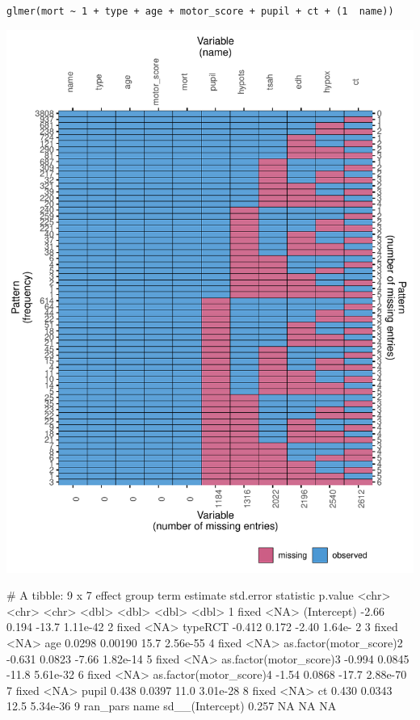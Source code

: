 \documentclass[
]{jss}
\begin{document}
\texttt{glmer(mort\ \textasciitilde{}\ 1\ +\ type\ +\ age\ +\ motor\_score\ +\ pupil\ +\ ct\ +\ (1\ \textbar{}\ name))}

\begin{CodeChunk}


\begin{center}\includegraphics{Imputation_of_Incomplete_Multilevel_Data_files/figure-latex/impact-1} \end{center}

\end{CodeChunk}

\begin{CodeChunk}
\begin{CodeOutput}
# A tibble: 9 x 7
  effect   group term                    estimate std.error statistic   p.value
  <chr>    <chr> <chr>                      <dbl>     <dbl>     <dbl>     <dbl>
1 fixed    <NA>  (Intercept)              -2.66     0.194      -13.7   1.11e-42
2 fixed    <NA>  typeRCT                  -0.412    0.172       -2.40  1.64e- 2
3 fixed    <NA>  age                       0.0298   0.00190     15.7   2.56e-55
4 fixed    <NA>  as.factor(motor_score)2  -0.631    0.0823      -7.66  1.82e-14
5 fixed    <NA>  as.factor(motor_score)3  -0.994    0.0845     -11.8   5.61e-32
6 fixed    <NA>  as.factor(motor_score)4  -1.54     0.0868     -17.7   2.88e-70
7 fixed    <NA>  pupil                     0.438    0.0397      11.0   3.01e-28
8 fixed    <NA>  ct                        0.430    0.0343      12.5   5.34e-36
9 ran_pars name  sd__(Intercept)           0.257   NA           NA    NA       
\end{CodeOutput}
\end{CodeChunk}
\end{document}
